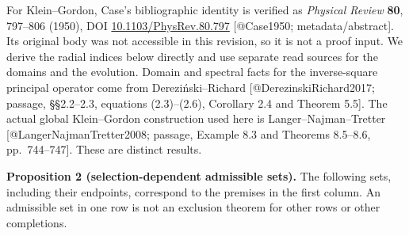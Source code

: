 \documentclass[11pt,a4paper]{article}
\begin{document}
For Klein--Gordon, Case's bibliographic identity is verified as
\emph{Physical Review} \textbf{80}, 797--806 (1950), DOI
\href{https://doi.org/10.1103/PhysRev.80.797}{10.1103/PhysRev.80.797}
{[}@Case1950; metadata/abstract{]}. Its original body was not accessible
in this revision, so it is not a proof input. We derive the radial
indices below directly and use separate read sources for the domains and
the evolution. Domain and spectral facts for the inverse-square
principal operator come from Dereziński--Richard
{[}@DerezinskiRichard2017; passage, §§2.2--2.3, equations (2.3)--(2.6),
Corollary 2.4 and Theorem 5.5{]}. The actual global Klein--Gordon
construction used here is Langer--Najman--Tretter
{[}@LangerNajmanTretter2008; passage, Example 8.3 and Theorems 8.5--8.6,
pp.~744--747{]}. These are distinct results.

\textbf{Proposition 2 (selection-dependent admissible sets).} The
following sets, including their endpoints, correspond to the premises in
the first column. An admissible set in one row is not an exclusion
theorem for other rows or other completions.
\end{document}

